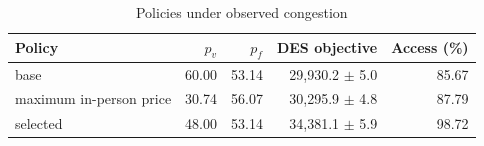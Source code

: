 \begin{table}[ht]
\centering\small
\caption{Policies under observed congestion}\label{tab:state}
\begin{tabular}{@{}lrrrr@{}}\toprule
Policy & $p_v$ & $p_f$ & DES objective & Access (\%)\\\midrule
base & 60.00 & 53.14 & 29,930.2 $\pm$ 5.0 & 85.67\\
maximum in-person price & 30.74 & 56.07 & 30,295.9 $\pm$ 4.8 & 87.79\\
selected & 48.00 & 53.14 & 34,381.1 $\pm$ 5.9 & 98.72\\
\bottomrule\end{tabular}
\end{table}
